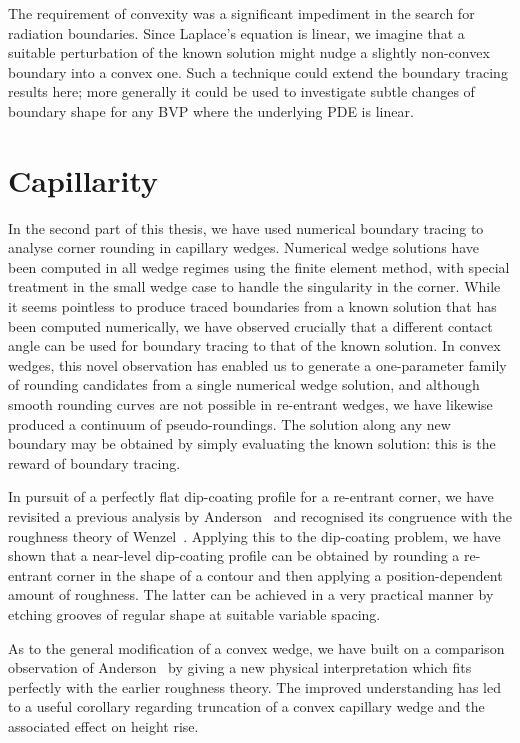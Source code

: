 The requirement of convexity was a significant impediment
in the search for radiation boundaries.
Since Laplace's equation is linear,
we imagine that a suitable perturbation of the known solution
might nudge a slightly non-convex boundary
into a convex one.
Such a technique could extend the boundary tracing results here;
more generally it could be used to investigate
subtle changes of boundary shape
for any BVP where the underlying PDE is linear.

\section{Capillarity}
\label{sec:concluding.capillarity}

In the second part of this thesis,
we have used numerical boundary tracing
to analyse corner rounding in capillary wedges.
Numerical wedge solutions have been computed in all wedge regimes
using the finite element method,
with special treatment in the small wedge case
to handle the singularity in the corner.
While it seems pointless to produce traced boundaries
from a known solution that has been computed numerically,
we have observed crucially that
a different contact angle can be used for boundary tracing
to that of the known solution.
In convex wedges,
this novel observation has enabled us to generate
a one-parameter family of rounding candidates
from a single numerical wedge solution,
and although smooth rounding curves
are not possible in re-entrant wedges,
we have likewise produced a continuum of pseudo-roundings.
The solution along any new boundary
may be obtained by simply evaluating the known solution:
this is the reward of boundary tracing.

In pursuit of a perfectly flat dip-coating profile
for a re-entrant corner,
we have revisited a previous analysis
by Anderson~\cite{anderson-2002-thesis-boundary-tracing-pdes}
and recognised its congruence with the roughness theory
of Wenzel~\cite{wenzel-1936-resistance-solid-surfaces-wetting}.
Applying this to the dip-coating problem,
we have shown that
a near-level dip-coating profile can be obtained
by rounding a re-entrant corner in the shape of a contour
and then applying a position-dependent amount of roughness.
The latter can be achieved in a very practical manner
by etching grooves of regular shape at suitable variable spacing.

As to the general modification of a convex wedge,
we have built on a comparison observation
of Anderson~\cite{anderson-2002-thesis-boundary-tracing-pdes}
by giving a new physical interpretation
which fits perfectly with the earlier roughness theory.
The improved understanding has led to a useful corollary
regarding truncation of a convex capillary wedge
and the associated effect on height rise.

